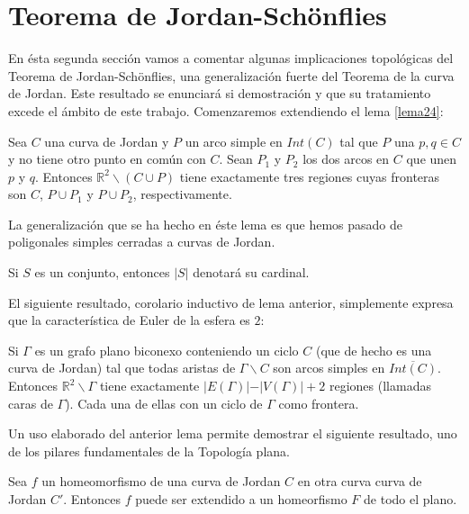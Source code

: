 \section{Teorema de Jordan-Schönflies}

En ésta segunda sección vamos a comentar algunas implicaciones topológicas del Teorema de Jordan-Schönflies, una generalización fuerte del Teorema de la curva de Jordan. Este resultado  se enunciará si demostración y que su tratamiento excede el ámbito de este trabajo. 
Comenzaremos extendiendo el lema \ref{lema24}:

\begin{lemma}
	Sea $C$ una curva de Jordan y $P$ un arco   simple en $Int(C)$ tal que $P$ una $p,q \in C$ y no tiene otro punto en común con $C$. Sean $P_1$ y $P_2$ los dos arcos en $C$ que unen $p$ y $q$. Entonces $\mathbb{R}^2 \backslash (C \cup P)$ tiene exactamente tres regiones cuyas fronteras son $C$, $P\cup P_1$ y $P\cup P_2$, respectivamente.
\end{lemma}

	La generalización que se ha hecho en éste lema es que hemos pasado de poligonales simples cerradas a curvas de Jordan.
	
	\begin{definition}
Si $S$ es un conjunto, entonces $\vert S \vert$ denotará su cardinal.
\end{definition}
El siguiente resultado, corolario inductivo de lema anterior, simplemente expresa que la característica de Euler de la esfera es $2$:
\begin{lemma}
	Si $\Gamma$ es un grafo plano biconexo conteniendo un ciclo $C$ (que de hecho es una curva de Jordan) tal que todas aristas de $\Gamma \backslash C$ son arcos simples en $\overline{Int(C)}$. Entonces $\mathbb{R}^2 \backslash \Gamma$ tiene exactamente $\vert E(\Gamma) \vert - \vert V(\Gamma) \vert + 2$ regiones (llamadas caras de $\Gamma$). Cada una de ellas con un ciclo de $\Gamma$ como frontera.
\end{lemma}

Un uso elaborado del anterior lema  permite demostrar el siguiente resultado, uno de los pilares fundamentales de la Topología plana.

\begin{theorem}
	Sea $f$ un homeomorfismo de una curva de Jordan $C$ en otra curva curva de Jordan $C'$. Entonces $f$ puede ser extendido a un homeorfismo $F$ de todo el plano.
\end{theorem}
 

